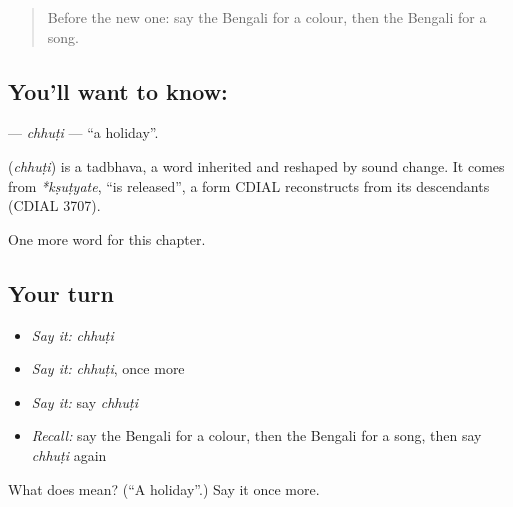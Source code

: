 \label{lesson:BN-C88-chhuti}



\begin{quote}
Before the new one: say the Bengali for a colour, then the Bengali for a song.
\end{quote}

\subsection*{You'll want to know: }
\textbf{} — \emph{chhuṭi} — \textquotedblleft{}a holiday\textquotedblright{}.

\begin{cousinweb}
\textbf{} (\emph{chhuṭi}) is a tadbhava, a word inherited and reshaped by sound change. It comes from \emph{*kṣuṭyate}, \textquotedblleft{}is released\textquotedblright{}, a form CDIAL reconstructs from its descendants (CDIAL 3707).
\end{cousinweb}

\begin{grammarlens}[title={What you've built}]
One more word for this chapter.
\end{grammarlens}

\subsection*{Your turn}
\begin{itemize}
\raggedright
  \item \emph{Say it:} \emph{chhuṭi}
  \item \emph{Say it:} \emph{chhuṭi}, once more
  \item \emph{Say it:} say \emph{chhuṭi}
  \item \emph{Recall:} say the Bengali for a colour, then the Bengali for a song, then say \emph{chhuṭi} again
\end{itemize}

\begin{tcolorbox}[breakable,colback=teal!4,colframe=teal!35!black,title={Before you move on}]
What does  mean? (\textquotedblleft{}A holiday\textquotedblright{}.) Say it once more.
\end{tcolorbox}
